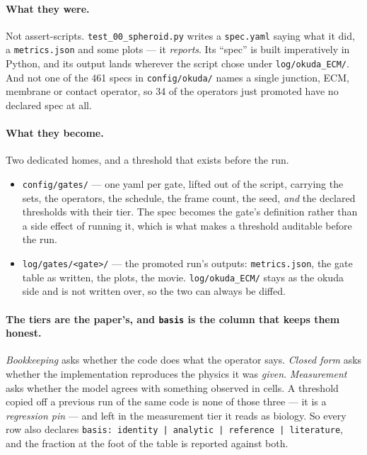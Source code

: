 \documentclass[11pt,a4paper]{article}
\newcommand{\code}[1]{\texttt{\small #1}}
\begin{document}
\paragraph{What they were.} Not assert-scripts. \code{test\_00\_spheroid.py} writes a
\code{spec.yaml} saying what it did, a \code{metrics.json} and some plots --- it \emph{reports}. Its
``spec'' is built imperatively in Python, and its output lands wherever the script chose under
\code{log/okuda\_ECM/}. And not one of the 461 specs in \code{config/okuda/} names a single junction,
ECM, membrane or contact operator, so 34 of the operators just promoted have no declared spec at all.

\paragraph{What they become.} Two dedicated homes, and a threshold that exists before the run.

\begin{itemize}
\item \code{config/gates/} --- one yaml per gate, lifted out of the script, carrying the sets, the
  operators, the schedule, the frame count, the seed, \emph{and} the declared thresholds with their
  tier. The spec becomes the gate's definition rather than a side effect of running it, which is what
  makes a threshold auditable before the run.
\item \code{log/gates/<gate>/} --- the promoted run's outputs: \code{metrics.json}, the gate table as
  written, the plots, the movie. \code{log/okuda\_ECM/} stays as the okuda side and is not written
  over, so the two can always be diffed.
\end{itemize}

\paragraph{The tiers are the paper's, and \code{basis} is the column that keeps them honest.}
\emph{Bookkeeping} asks whether the code does what the operator says. \emph{Closed form} asks whether
the implementation reproduces the physics it was \emph{given}. \emph{Measurement} asks whether the
model agrees with something observed in cells. A threshold copied off a previous run of the same code
is none of those three --- it is a \emph{regression pin} --- and left in the measurement tier it reads
as biology. So every row also declares \code{basis: identity | analytic | reference | literature},
and the fraction at the foot of the table is reported against both.
\end{document}

